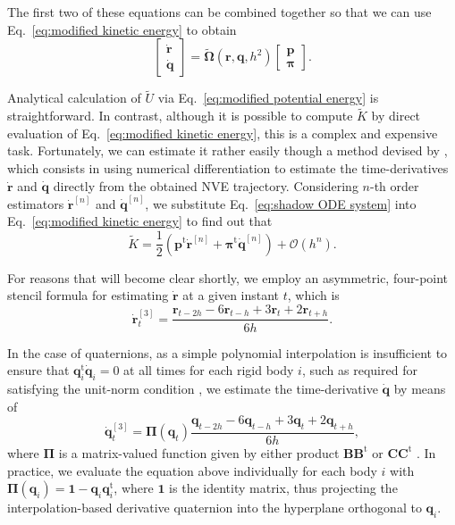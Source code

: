 \documentclass[
journal=jctcce,
layout=twocolumn
]{achemso}
\newcommand{\mt}[1]{\boldsymbol{\mathbf{#1}}}   %
\newcommand{\vt}[1]{\boldsymbol{\mathbf{#1}}}   %
\newcommand{\tr}[1]{#1^\text{t}}                %
\newcommand{\timestep}{h}
\newcommand{\modified}[1]{\widetilde{#1}}
\begin{document}
The first two of these equations can be combined together so that we can use Eq.~\eqref{eq:modified kinetic energy} to obtain
\begin{equation}
\label{eq:shadow ODE system}
\left[\begin{array}{c} \dot{\vt r} \\ \dot{\vt q} \end{array}\right] = \modified{\mathbf \Omega}(\vt r, \vt q, \timestep^2) \left[\begin{array}{c} \vt p \\ \vt \pi \end{array}\right].
\end{equation}

Analytical calculation of $\modified U$ via Eq.~\eqref{eq:modified potential energy} is straightforward.
In contrast, although it is possible to compute $\modified K$ by direct evaluation of Eq.~\eqref{eq:modified kinetic energy}, this is a complex and expensive task.
Fortunately, we can estimate it rather easily though a method devised by \citeauthor{Eastwood_2010} \cite{Eastwood_2010}, which consists in using numerical differentiation to estimate the time-derivatives $\dot{\vt r}$ and $\dot{\vt q}$ directly from the obtained NVE trajectory.
Considering $n$-th order estimators $\dot{\vt r}^{[n]}$ and $\dot{\vt q}^{[n]}$, we substitute Eq.~\eqref{eq:shadow ODE system} into Eq.~\eqref{eq:modified kinetic energy} to find out that
\begin{equation}
\label{eq:modified kinetic energy estimator}
\modified K = \frac{1}{2} \left( \tr{\vt p} \dot{\vt r}^{[n]} + \tr{\vt \pi} \dot{\vt q}^{[n]} \right) + \mathcal{O}(h^n).
\end{equation}

For reasons that will become clear shortly, we employ an asymmetric, four-point stencil formula for estimating $\dot{\vt r}$ at a given instant $t$, which is
\begin{equation*}
\dot{\vt r}^{[3]}_t = \frac{{\vt r}_{t-2\timestep} - 6 {\vt r}_{t-\timestep} + 3 {\vt r}_t + 2 {\vt r}_{t+\timestep}}{6\timestep}.
\end{equation*}

In the case of quaternions, as a simple polynomial interpolation is insufficient to ensure that $\tr{\vt q}_i \dot{\vt q}_i = 0$ at all times for each rigid body $i$, such as required for satisfying the unit-norm condition \cite{Silveira_2017}, we estimate the time-derivative $\dot{\vt q}$ by means of\cite{Schay_1995}
\begin{equation*}
\dot{\vt q}^{[3]}_t = {\mt \Pi}({\vt q}_t) \frac{{\vt q}_{t-2\timestep} - 6 {\vt q}_{t-\timestep} + 3 {\vt q}_t + 2 {\vt q}_{t+\timestep}}{6\timestep},
\end{equation*}
where ${\mt \Pi}$ is a matrix-valued function given by either product ${\mt B}\tr{\mt B}$ or ${\mt C}\tr{\mt C}$ \cite{Silveira_2017}.
In practice, we evaluate the equation above individually for each body $i$ with ${\mt \Pi}({\vt q}_i) = {\mt 1} - {\vt q}_i \tr{\vt q}_i$, where $\mt 1$ is the identity matrix, thus projecting the interpolation-based derivative quaternion into the hyperplane orthogonal to ${\vt q}_i$.
\end{document}
